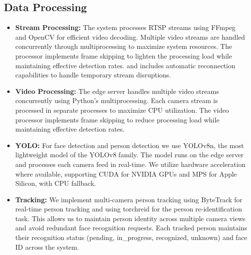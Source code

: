 \documentclass[conference]{IEEEtran}
\begin{document}
\subsection{Data Processing}
\begin{itemize}
      \item \textbf{Stream Processing:} The system processes RTSP streams using FFmpeg and OpenCV for efficient video decoding.
            Multiple video streams are handled concurrently through multiprocessing to maximize system resources.
            The processor implements frame skipping to lighten the processing load while maintaining effective detection rates.
            and includes automatic reconnection capabilities to handle temporary stream disruptions.
      \item \textbf{Video Processing:} The edge server handles multiple video streams concurrently using Python's multiprocessing. 
            Each camera stream is processed in separate processes to maximize CPU utilization. The video processor implements frame skipping 
            to reduce processing load while maintaining effective detection rates.
      \item \textbf{YOLO:} For face detection and person detection we use YOLOv8n, the most lightweight model of the YOLOv8 family. 
            The model runs on the edge server and processes each camera feed in real-time. We utilize hardware acceleration where available,
            supporting CUDA for NVIDIA GPUs and MPS for Apple Silicon, with CPU fallback.
      \item \textbf{Tracking:} We implement multi-camera person tracking using ByteTrack for real-time person tracking and using torchreid for the person re-identification task. 
            This allows us to maintain person identity across multiple camera views and avoid redundant face recognition requests. 
            Each tracked person maintains their recognition status (pending, in\_progress, recognized, unknown) and face ID across the system.
\end{itemize}
\end{document}
